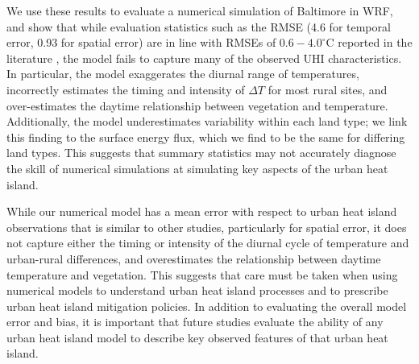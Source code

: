  We use these results to evaluate a numerical simulation of Baltimore in WRF, and show that while evaluation statistics such as the RMSE (4.6 for temporal error, 0.93 for spatial error) are in line with RMSEs of $0.6-4.0^\circ$C reported in the literature  \citep{kim2013evaluation}, the model fails to capture many of the observed UHI characteristics. In particular, the model exaggerates the diurnal range of temperatures, incorrectly estimates the timing and intensity of $\Delta T$ for most rural sites, and over-estimates the daytime relationship between vegetation and temperature. 
 Additionally, the model underestimates variability within each land type;%
 we link this finding to the surface energy flux, which we find to be the same for differing land types. This suggests that summary statistics may not accurately diagnose the skill of numerical simulations at simulating key aspects of the urban heat island. 

While our numerical model has a mean error with respect to urban heat island observations that is similar to other studies, particularly for spatial error, it does not capture either the timing or intensity of the diurnal cycle of temperature and urban-rural differences, and overestimates the relationship between daytime temperature and vegetation. This suggests that care must be taken when using numerical models to understand urban heat island processes and to prescribe urban heat island mitigation policies. 
In addition to evaluating the overall model error and bias, it is important that future studies evaluate the ability of any urban heat island model to describe key observed features of that urban heat island. 


